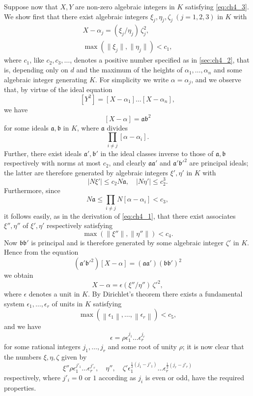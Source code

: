 Suppose now that $X, Y$ are non-zero algebraic integers in $K$ satisfying \eqref{eq:ch4_3}. We show first that there exist algebraic integers $\xi_j, \eta_j, \zeta_j \ (j=1,2,3)$ in $K$ with
\begin{equation} \label{eq:ch4_4}\tag{4}
\begin{gathered}
X - \alpha_j = (\xi_j/\eta_j) \, \zeta_j^2, \\
\max (\|\xi_j\|, \|\eta_j\|) < c_1,
\end{gathered}
\end{equation}
where $c_1$, like $c_2, c_3, \dots$, denotes a positive number specified as in \autoref{sec:ch4_2}, that is, depending only on $d$ and the maximum of the heights of $\alpha_1, \dots, \alpha_n$ and some algebraic integer generating $K$. For simplicity we write $\alpha = \alpha_j$, and we observe that, by virtue of the ideal equation
\[
[Y^2] = [X - \alpha_1] \dots [X - \alpha_n],
\]
we have
\[
[X - \alpha] = \mathfrak{ab}^2
\]
for some ideals $\mathfrak{a, b}$ in $K$, where $\mathfrak{a}$ divides
\[
\prod_{i \neq j} [\alpha - \alpha_i].
\]
Further, there exist ideals $\mathfrak{a', b'}$ in the ideal classes inverse to those of $\mathfrak{a, b}$ respectively with norms at most $c_2$, and clearly $\mathfrak{aa'}$ and $\mathfrak{a'b'^2}$ are principal ideals; the latter are therefore generated by algebraic integers $\xi', \eta'$ in $K$ with
\[
|N\xi'| \le c_2 N\mathfrak{a}, \quad |N\eta'| \le c_2^3.
\]
Furthermore, since
\[
N\mathfrak{a} \le \prod_{i \neq j} N[\alpha - \alpha_i] < c_3,
\]
it follows easily, as in the derivation of \eqref{eq:ch4_1}, that there exist associates $\xi'', \eta''$ of $\xi', \eta'$ respectively satisfying
\[
\max(\|\xi''\|, \|\eta''\|) < c_4.
\]
Now $\mathfrak{bb'}$ is principal and is therefore generated by some algebraic integer $\zeta'$ in $K$. Hence from the equation
\[
(\mathfrak{a'b'^2})[X-\alpha] = (\mathfrak{aa'})(\mathfrak{bb'})^2
\]
we obtain
\[
X-\alpha=\epsilon(\xi''/\eta'')\,\zeta'^2,
\]
where $\epsilon$ denotes a unit in $K$. By Dirichlet's theorem there exists a fundamental system $\epsilon_1, \dots, \epsilon_r$ of units in $K$ satisfying
\[
\max \left(\left\| \epsilon_1 \right\|, \dots, \left\| \epsilon_r \right\| \right) < c_5,
\]
and we have
\[
\epsilon = \rho \epsilon_1^{j_1} \dots \epsilon_r^{j_r}
\]
for some rational integers $j_1, \dots, j_r$ and some root of unity $\rho$; it is now clear that the numbers $\xi, \eta, \zeta$ given by
\[
\xi'' \rho \epsilon_1^{j'_1} \dots \epsilon_r^{j'_r}, \quad \eta'', \quad \zeta' \epsilon_1^{\frac{1}{2}(j_1-j'_1)} \dots \epsilon_r^{\frac{1}{2}(j_r-j'_r)}
\]
respectively, where $j'_i = 0$ or $1$ according as $j_i$ is even or odd, have the required properties.

